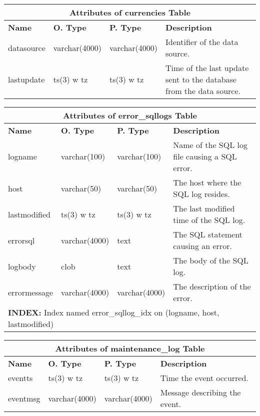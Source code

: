 \begin{center}
  \begin{tabular}{|l|l|l|p{3.3in}|}\hline
    \multicolumn{4}{|c|}{\textbf{Attributes of currencies Table}}\\ \hline
    \textbf{Name} & \textbf{O. Type} & \textbf{P. Type} & \textbf{Description}\\ \hline
    datasource & varchar(4000) & varchar(4000) & Identifier of the data source.\\ \hline
    lastupdate & ts(3) w tz & ts(3) w tz & Time of the last update sent to the database from the data source.\\ \hline
  \end{tabular}
\vspace{24pt}

  \begin{tabular}{|l|l|l|p{3.2in}|}\hline
    \multicolumn{4}{|c|}{\textbf{Attributes of error\_sqllogs Table}}\\ \hline
    \textbf{Name} & \textbf{O. Type} & \textbf{P. Type} & \textbf{Description}\\ \hline
    logname & varchar(100) & varchar(100) & Name of the {SQL} log file causing a {SQL} error. \\ \hline
    host & varchar(50) & varchar(50) & The host where the {SQL} log resides.\\ \hline
    lastmodified & ts(3) w tz & ts(3) w tz & The last modified time of the {SQL} log. \\ \hline
    errorsql & varchar(4000) & text & The {SQL} statement causing an error.\\ \hline
    logbody & clob & text & The body of the {SQL} log.\\ \hline
    errormessage & varchar(4000) & varchar(4000) & The description of the error.\\
    \multicolumn{4}{|l|}{\textbf{INDEX:} Index named error\_sqllog\_idx on (logname, host, lastmodified)}\\ \hline
  \end{tabular}
\vspace{24pt}

  \begin{tabular}{|l|l|l|p{3.4in}|}\hline
    \multicolumn{4}{|c|}{\textbf{Attributes of maintenance\_log Table}}\\ \hline
    \textbf{Name} & \textbf{O. Type} & \textbf{P. Type} & \textbf{Description}\\ \hline
    eventts & ts(3) w tz & ts(3) w tz & Time the event occurred.\\ \hline
    eventmsg & varchar(4000) & varchar(4000) & Message describing the event.\\ \hline
  \end{tabular}
\vspace{24pt}


\end{center}

